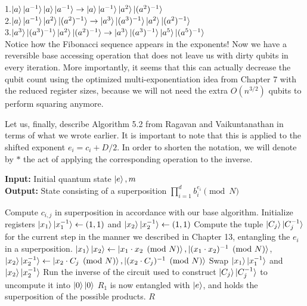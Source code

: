 1.$\ket{a} \ket{a^{-1}} \ket{a} \ket{a^{-1}} \to \ket{a} \ket{a^{-1}} \ket{a^2} \ket{(a^{2})^{-1}}$\\
2.$\ket{a} \ket{a^{-1}} \ket{a^2} \ket{(a^{2})^{-1}} \to \ket{a^3} \ket{(a^{3})^{-1}} \ket{a^2} \ket{(a^{2})^{-1}}$\\
3.$\ket{a^3} \ket{(a^{3})^{-1}} \ket{a^2} \ket{(a^{2})^{-1}} \to \ket{a^3} \ket{(a^{3})^{-1}} \ket{a^5} \ket{(a^{5})^{-1}}$\\

Notice how the Fibonacci sequence appears in the exponents! Now we have a reversible base accessing operation that does not leave us with dirty qubits in every iteration. More importantly, it seems that this can actually decrease the qubit count using the optimized multi-exponentiation idea from Chapter 7 with the reduced register sizes, because we will not need the extra $O(n^{3/2})$ qubits to perform squaring anymore.

Let us, finally, describe Algorithm 5.2 from Ragavan and Vaikuntanathan\cite{RagavanVaikuntanathan2023} in terms of what we wrote earlier. It is important to note that this is applied to the shifted exponent $e_i = c_i + D/2$. In order to shorten the notation, we will denote by $*$ the act of applying the corresponding operation to the inverse.

\begin{algorithm}[H]
\caption{Fibonacci multi-exponentiation (top-down)}
\textbf{Input:} Initial quantum state $\ket{e}, m$\\
\textbf{Output:} State consisting of a superposition $\prod_{i=1}^d b_i^{e_i} \pmod N$
\begin{algorithmic}[1]
\State Compute $c_{i,j}$ in superposition in accordance with our base algorithm.
\State Initialize registers $\ket{x_1}\ket{x_1^{-1}} \gets (1,1)$ and $\ket{x_2}\ket{x_2^{-1}} \gets (1,1)$
    \State Compute the tuple $\ket{C_j}\ket{C_j^{-1}}$ for the current step in the manner we described in Chapter 13, entangling the $e_i$ in a superposition.
    \State $\ket{x_1}\ket{x_2} \gets \ket{x_1 \cdot x_2 \pmod N},\ket{(x_1 \cdot x_2)^{-1} \pmod N}$,
    \State $\ket{x_2}\ket{x_2^{-1}} \gets \ket{x_2 \cdot C_j \pmod N},\ket{(x_2 \cdot C_j)^{-1} \pmod N}$
    \State Swap $\ket{x_1}\ket{x_1^{-1}}$ and $\ket{x_2}\ket{x_2^{-1}}$
    \State Run the inverse of the circuit used to construct $\ket{C_j}\ket{C_j^{-1}}$ to uncompute it into $\ket{0} \ket{0}$
\EndFor
\State $R_1$ is now entangled with $\ket{e}$, and holds the superposition of the possible products.
\State \Return $R$
\end{algorithmic}
\end{algorithm}

